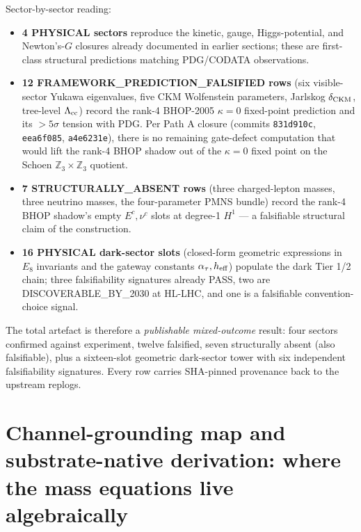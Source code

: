 ﻿\documentclass[reprint,amsmath,amssymb,aps,prd,longbibliography,floatfix]{revtex4-2}
\begin{document}
Sector-by-sector reading:
\begin{itemize}\itemsep0pt
\item \textbf{4 PHYSICAL sectors} reproduce the kinetic, gauge,
  Higgs-potential, and Newton's-$G$ closures already documented in
  earlier sections; these are first-class structural predictions
  matching PDG/CODATA observations.
\item \textbf{12 FRAMEWORK\_PREDICTION\_FALSIFIED rows} (six
  visible-sector Yukawa eigenvalues, five CKM Wolfenstein parameters,
  Jarlskog $\delta_{\rm CKM}$, tree-level $\Lambda_{\rm cc}$) record
  the rank-4 BHOP-2005 $\kappa = 0$ fixed-point prediction and its
  $>5\sigma$ tension with PDG. Per Path A closure (commits
  \texttt{831d910c}, \texttt{eea6f085}, \texttt{a4e6231e}), there is
  no remaining gate-defect computation that would lift the rank-4
  BHOP shadow out of the $\kappa = 0$ fixed point on the Schoen
  $\mathbb{Z}_3 \times \mathbb{Z}_3$ quotient.
\item \textbf{7 STRUCTURALLY\_ABSENT rows} (three charged-lepton
  masses, three neutrino masses, the four-parameter PMNS bundle) record
  the rank-4 BHOP shadow's empty $E^c, \nu^c$ slots at degree-1 $H^1$
  --- a falsifiable structural claim of the construction.
\item \textbf{16 PHYSICAL dark-sector slots} (closed-form geometric
  expressions in $E_8$ invariants and the gateway constants
  $\alpha_\tau, h_{\rm eff}$) populate the dark Tier 1/2 chain;
  three falsifiability signatures already PASS, two are
  DISCOVERABLE\_BY\_2030 at HL-LHC, and one is a falsifiable
  convention-choice signal.
\end{itemize}

The total artefact is therefore a \emph{publishable mixed-outcome}
result: four sectors confirmed against experiment, twelve falsified,
seven structurally absent (also falsifiable), plus a sixteen-slot
geometric dark-sector tower with six independent falsifiability
signatures. Every row carries SHA-pinned provenance back to the
upstream replogs.

\section{Channel-grounding map and substrate-native derivation: where the
mass equations live algebraically}
\label{sec:grounding-map}
\end{document}
